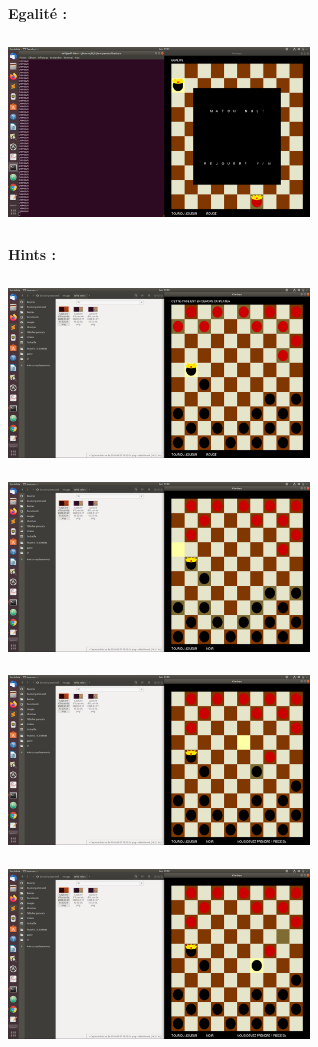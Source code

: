 \documentclass[a4paper]{article}
\begin{document}
\bigbreak
\bigbreak
\bigbreak
\bigbreak
\bigbreak
\bigbreak
\bigbreak
\bigbreak
\large\bf{Egalité : }
\bigbreak

\includegraphics[width = 8cm, height = 5cm]{egalite.png}
\bigbreak



\large\bf{Hints : }
\bigbreak


\includegraphics[width = 8cm, height = 5cm]{hints1.png}
\includegraphics[width = 8cm, height = 5cm]{hints2.png}
\bigbreak
\includegraphics[width = 8cm, height = 5cm]{hints3.png}
\includegraphics[width = 8cm, height = 5cm]{hints4.png}
\end{document}
